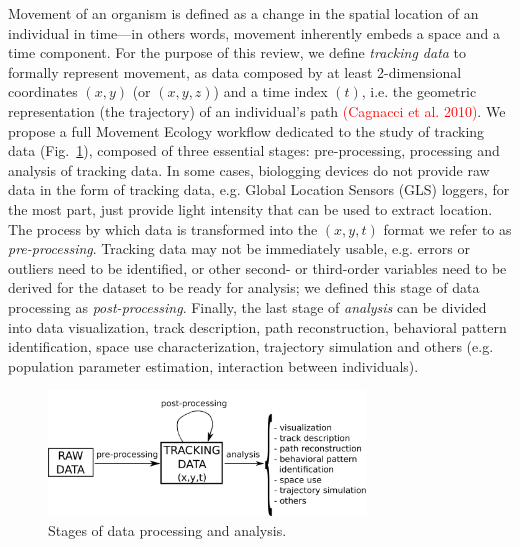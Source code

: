 \documentclass[a4paper,12pt]{article}
\begin{document}
Movement of an organism is defined as a change in the spatial location of an individual in time---in others words, movement inherently embeds a space and a time component. For the purpose of this review, we define \emph{tracking data} to formally represent movement, as data composed by at least 2-dimensional coordinates $(x,y)$ (or $(x,y,z)$) and a time index $(t)$, i.e. the geometric representation (the trajectory) of an individual's path \textcolor{red}{(Cagnacci et al. 2010)}. We propose a full Movement Ecology workflow dedicated to the study of tracking data (Fig.~\ref{fig:DataProcess}), composed of three essential stages: pre-processing, processing and analysis of tracking data. In some cases, biologging devices do not provide raw data in the form of tracking data, e.g.  Global Location Sensors (GLS) loggers, for the most part, just provide light intensity that can be used to extract location. The process by which data is transformed into the $(x,y,t)$ format we refer to as \emph{pre-processing}. Tracking data may not be immediately usable, e.g. errors or outliers need to be identified, or other second- or third-order variables need to be derived for the dataset to be ready for analysis; we defined this stage of data processing as \emph{post-processing}. Finally, the last stage of \emph{analysis} can be divided into data visualization, track description, path reconstruction, behavioral pattern identification, space use characterization, trajectory simulation and others (e.g. population parameter estimation, interaction between individuals).

\begin{figure}
        \centering
        \includegraphics[width=0.75\textwidth]{./mes_images/process-sketch-3.pdf}
        \caption{\label{fig:DataProcess} Stages of data processing and analysis.}
\end{figure} 
\end{document}

